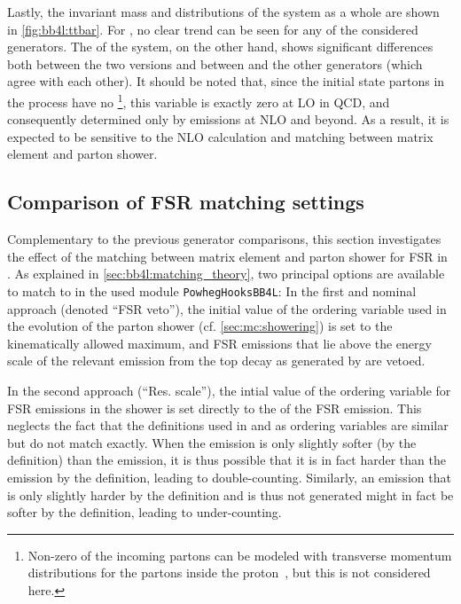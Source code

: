 Lastly, the invariant mass and \pt distributions of the \ttbar system as a whole are shown in \cref{fig:bb4l:ttbar}. For \mtt, no clear trend can be seen for any of the considered generators. The \pt of the \ttbar system, on the other hand, shows significant differences both between the two \bbfourl versions and between \bbfourl and the other generators (which agree with each other). It should be noted that, since the initial state partons in the \pptt process have no \pt\footnote{Non-zero \pt of the incoming partons can be modeled with transverse momentum distributions for the partons inside the proton~\cite{Boer:2011fh}, but this is not considered here.}, this variable is exactly zero at LO in QCD, and consequently determined only by emissions at NLO and beyond. As a result, it is expected to be sensitive to the NLO calculation and matching between matrix element and parton shower.

\subsection{Comparison of FSR matching settings}
\label{sec:bb4l:matching}

Complementary to the previous generator comparisons, this section investigates the effect of the matching between matrix element and parton shower for FSR in \bbfourl. As explained in \cref{sec:bb4l:matching_theory}, two principal options are available to match \bbfourl to \pythia in the used module \texttt{PowhegHooksBB4L}: In the first and nominal approach (denoted ``FSR veto''), the initial value of the ordering variable used in the evolution of the parton shower (cf. \cref{sec:mc:showering}) is set to the kinematically allowed maximum, and FSR emissions that lie above the \powheg energy scale of the relevant emission from the top decay as generated by \powheg are vetoed.

In the second approach (``Res. scale''), the intial value of the ordering variable for FSR emissions in the shower is set directly to the \pt of the \powheg FSR emission. This neglects the fact that the \pt definitions used in \powheg and \pythia as ordering variables are similar but do not match exactly. When the \pythia emission is only slightly softer (by the \pythia definition) than the \powheg emission, it is thus possible that it is in fact harder than the \powheg emission by the \powheg definition, leading to double-counting. Similarly, an emission that is only slightly harder by the \pythia definition and is thus not generated might in fact be softer by the \powheg definition, leading to under-counting.

